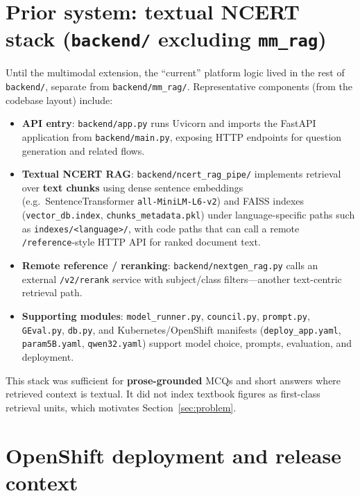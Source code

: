 \documentclass[11pt]{article}
\begin{document}
\section{Prior system: textual NCERT stack (\texttt{backend/} excluding \texttt{mm\_rag})}
\label{sec:prior}

Until the multimodal extension, the ``current'' platform logic lived in the rest of \texttt{backend/}, separate from \texttt{backend/mm\_rag/}. Representative components (from the codebase layout) include:

\begin{itemize}
  \item \textbf{API entry}: \texttt{backend/app.py} runs Uvicorn and imports the FastAPI application from \texttt{backend/main.py}, exposing HTTP endpoints for question generation and related flows.
  \item \textbf{Textual NCERT RAG}: \texttt{backend/ncert\_rag\_pipe/} implements retrieval over \textbf{text chunks} using dense sentence embeddings (e.g.\ SentenceTransformer \texttt{all-MiniLM-L6-v2}) and FAISS indexes (\texttt{vector\_db.index}, \texttt{chunks\_metadata.pkl}) under language-specific paths such as \texttt{indexes/<language>/}, with code paths that can call a remote \texttt{/reference}-style HTTP API for ranked document text.
  \item \textbf{Remote reference / reranking}: \texttt{backend/nextgen\_rag.py} calls an external \texttt{/v2/rerank} service with subject/class filters---another text-centric retrieval path.
  \item \textbf{Supporting modules}: \texttt{model\_runner.py}, \texttt{council.py}, \texttt{prompt.py}, \texttt{GEval.py}, \texttt{db.py}, and Kubernetes/OpenShift manifests (\texttt{deploy\_app.yaml}, \texttt{param5B.yaml}, \texttt{qwen32.yaml}) support model choice, prompts, evaluation, and deployment.
\end{itemize}

\noindent
This stack was sufficient for \textbf{prose-grounded} MCQs and short answers where retrieved context is textual. It did not index textbook figures as first-class retrieval units, which motivates Section~\ref{sec:problem}.

\section{OpenShift deployment and release context}
\label{sec:openshift}
\end{document}
